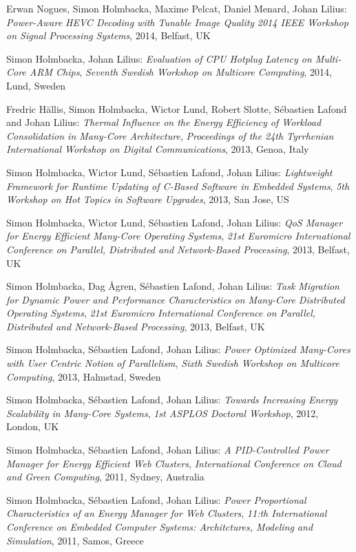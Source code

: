 \documentclass[margin,line]{resume}
\begin{document}
\begin{resume}
Erwan Nogues, Simon Holmbacka, Maxime Pelcat, Daniel Menard, Johan Lilius:
\textit{Power-Aware HEVC Decoding with Tunable Image Quality}
\textsl{2014 IEEE Workshop on Signal Processing Systems}, 2014, Belfast, UK

Simon Holmbacka, Johan Lilius: 
\textit{Evaluation of CPU Hotplug Latency on Multi-Core ARM Chips},
\textsl{Seventh Swedish Workshop on Multicore Computing}, 2014, Lund, Sweden 

Fredric H\"{a}llis, Simon Holmbacka, Wictor Lund, Robert Slotte, S\'{e}bastien Lafond and Johan Lilius:
\textit{Thermal Influence on the Energy Efficiency of Workload Consolidation in Many-Core Architecture}, 
\textsl{Proceedings of the 24th Tyrrhenian International Workshop on Digital Communications}, 2013, Genoa, Italy 

Simon Holmbacka, Wictor Lund, S\'{e}bastien Lafond, Johan Lilius: 
\textit{Lightweight Framework for Runtime Updating of C-Based Software in Embedded Systems},
\textsl{5th Workshop on Hot Topics in Software Upgrades}, 2013, San Jose, US

Simon Holmbacka, Wictor Lund, S\'{e}bastien Lafond, Johan Lilius: 
\textit{QoS Manager for Energy Efficient Many-Core Operating Systems},
\textsl{21st Euromicro International Conference on Parallel, Distributed and Network-Based Processing}, 2013, Belfast, UK

Simon Holmbacka, Dag \AA{}gren, S\'{e}bastien Lafond, Johan Lilius: 
\textit{Task Migration for Dynamic Power and Performance Characteristics on Many-Core Distributed Operating Systems},
\textsl{21st Euromicro International Conference on Parallel, Distributed and Network-Based Processing}, 2013, Belfast, UK

Simon Holmbacka, S\'{e}bastien Lafond, Johan Lilius: 
\textit{Power Optimized Many-Cores with User Centric Notion of Parallelism},
\textsl{Sixth Swedish Workshop on Multicore Computing}, 2013, Halmstad, Sweden
  
Simon Holmbacka, S\'{e}bastien Lafond, Johan Lilius: 
\textit{Towards Increasing Energy Scalability in Many-Core Systems}, 
\textsl{1st ASPLOS Doctoral Workshop}, 2012, London, UK

Simon Holmbacka, S\'{e}bastien Lafond, Johan Lilius: 
\textit{A PID-Controlled Power Manager for Energy Efficient Web Clusters}, 
\textsl{International Conference on Cloud and Green Computing}, 2011, Sydney, Australia 

Simon Holmbacka, S\'{e}bastien Lafond, Johan Lilius: 
\textit{Power Proportional Characteristics of an Energy Manager for Web Clusters}, 
\textsl{11:th International Conference on Embedded Computer Systems: Architctures, Modeling and Simulation}, 2011, Samos, Greece


\end{resume}
\end{document}
